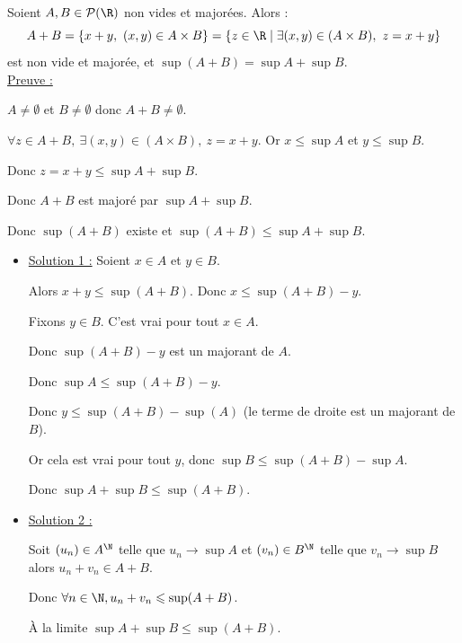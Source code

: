 \begin{exemple}
    Soient $A, B \in \mathcal P(\R)$ non vides et majorées.
    Alors :
     \[A + B = \{x + y,~(x,y) \in A \times B\} = \{z \in \R \mid \exists (x, y) \in (A \times B),~z = x + y\}\]
    est non vide et majorée, et $\sup( A + B) = \sup A + \sup B$. \\

    \uline{Preuve :}

    $A \neq \emptyset$ et $B \neq \emptyset$ donc $A + B \neq \emptyset$.

    $\forall z \in A + B,~\exists(x, y) \in (A \times B),~z = x + y$.
    Or $x \leqslant \sup A $ et $y \leqslant \sup B$.

    Donc $z = x + y \leqslant \sup A + \sup B$.

    Donc $A + B$ est majoré par $\sup A + \sup B$.

    Donc $\sup(A+ B)$ existe et $\sup (A + B) \leqslant \sup A + \sup B$.

    \begin{itemize}
        \item \uline{Solution 1 :}
        Soient $x \in A$ et $y \in B$.

        Alors $x + y \leqslant \sup(A + B)$.
        Donc $x \leqslant \sup(A + B) - y$.

        Fixons $y \in B$. C'est vrai pour tout $x \in A$.

        Donc $\sup(A + B) - y$ est un majorant de $A$. 

        Donc $\sup A \leqslant \sup(A + B) - y$.

        Donc $y \leqslant \sup(A + B) - \sup(A)$ (le terme de droite est un majorant de $B$).

        Or cela est vrai pour tout $y$, donc $\sup B \leqslant \sup(A + B) - \sup A$.

        Donc $\sup A + \sup B \leqslant \sup(A + B)$.

        \item \uline{Solution 2 :}

        Soit $(u_n) \in A^{\N}$ telle que $u_n \to \sup A$
        et $(v_n) \in B^{\N}$ telle que $ v_n \to \sup B$
        alors $u_n + v_n \in A + B$. 

        Donc $\forall n \in \N, u_n + v_n \leqslant \sup(A + B)$.
    
        À la limite $\sup A + \sup B \leqslant \sup(A + B)$.
    \end{itemize}
\end{exemple}

